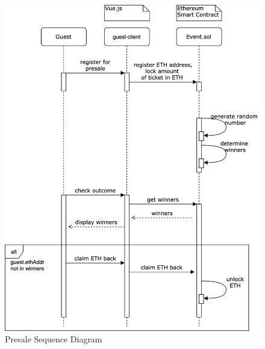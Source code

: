 \begin{figure}[H]
    \centering
    \includegraphics[width=14cm]{design/diagrams/presale.png}
    \caption{Presale Sequence Diagram}
    \label{fig:presale-seuquence-diagram}
\end{figure}

